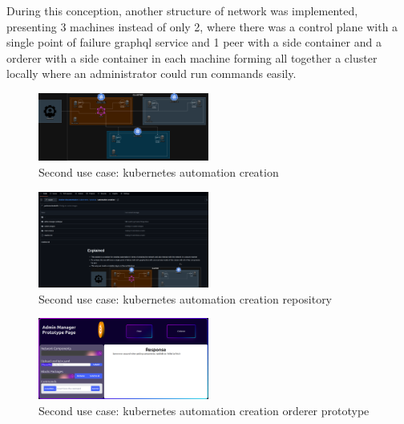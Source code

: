 During this conception, another structure of network was implemented, presenting 3 machines instead of only 2, where there was a control plane with a single point of failure graphql service and 1 peer with a side container and a orderer with a side container in each machine forming all together a cluster locally where an administrator could run commands easily.

\begin{figure}[H]
    \centering
    \includegraphics[width=0.5\textwidth]{assets/use-case-2/automation-diagram.drawio.png} %
    \caption{Second use case: kubernetes automation creation}
    \label{fig:sample-image} 
\end{figure}

\begin{figure}[H]
    \centering
    \includegraphics[width=0.5\textwidth]{assets/use-case-2/automation-creation.png} %
    \caption{Second use case: kubernetes automation creation repository}
    \label{fig:sample-image} 
\end{figure}

\begin{figure}[H]
    \centering
    \includegraphics[width=0.5\textwidth]{assets/use-case-2/orderer-admin-manager.png} %
    \caption{Second use case: kubernetes automation creation orderer prototype}
    \label{fig:sample-image} 
\end{figure}

